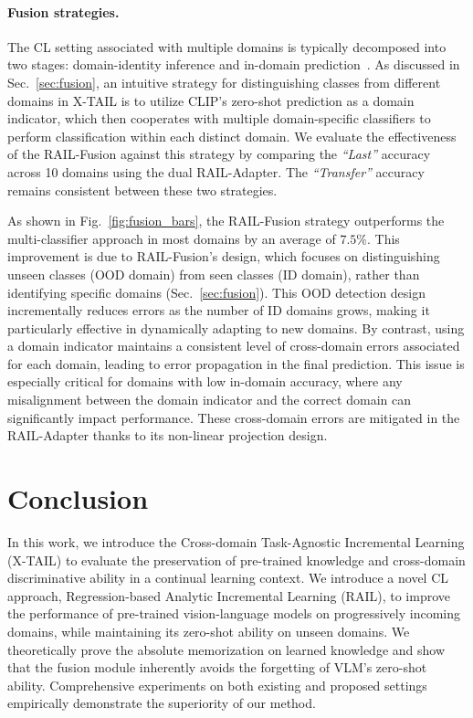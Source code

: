 \documentclass{article}
\begin{document}
\paragraph{Fusion strategies.} The CL setting associated with multiple domains is typically decomposed into two stages: domain-identity inference and in-domain prediction~\cite{wang2024hierarchical}. As discussed in Sec.~\ref{sec:fusion}, an intuitive strategy for distinguishing classes from different domains in X-TAIL is to utilize CLIP's zero-shot prediction as a domain indicator, which then cooperates with multiple domain-specific classifiers to perform classification within each distinct domain. We evaluate the effectiveness of the RAIL-Fusion against this strategy by comparing the \emph{``Last''} accuracy across 10 domains using the dual RAIL-Adapter. The \emph{``Transfer''} accuracy remains consistent between these two strategies.

As shown in Fig.~\ref{fig:fusion_bars}, the RAIL-Fusion strategy outperforms the multi-classifier approach in most domains by an average of $7.5\%$. This improvement is due to RAIL-Fusion's design, which focuses on distinguishing unseen classes (OOD domain) from seen classes (ID domain), rather than identifying specific domains (Sec.~\ref{sec:fusion}). This OOD detection design incrementally reduces errors as the number of ID domains grows, making it particularly effective in dynamically adapting to new domains. By  contrast, using a domain indicator maintains a consistent level of cross-domain errors associated for each domain, leading to error propagation in the final prediction. This issue is especially critical for domains with low in-domain accuracy, where any misalignment between the domain indicator and the correct domain can significantly impact performance. These cross-domain errors are mitigated in the RAIL-Adapter thanks to its non-linear projection design. 

\section{Conclusion}
In this work, we introduce the Cross-domain Task-Agnostic Incremental Learning (X-TAIL) to evaluate the preservation of pre-trained knowledge and cross-domain discriminative ability in a continual learning context. 
We introduce a novel CL approach, Regression-based Analytic Incremental Learning (RAIL), to improve the performance of pre-trained vision-language models on progressively incoming domains, while maintaining its zero-shot ability on unseen domains. We theoretically prove the absolute memorization on learned knowledge and show that the fusion module inherently avoids the forgetting of VLM's zero-shot ability. Comprehensive experiments on both existing and proposed settings empirically demonstrate the superiority of our method.
\end{document}
